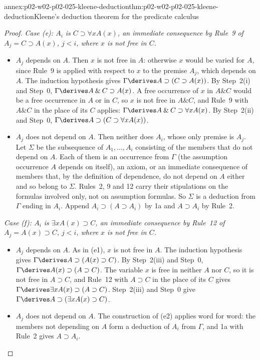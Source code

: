 \begin{annexitem}{annex:p02-w02-p02-025-kleene-deduction}{thm:p02-w02-p02-025-kleene-deduction}{Kleene's deduction theorem for the predicate calculus}
\begin{proof}
\emph{Case (e): \(A_i\) is \(C\supset\forall xA(x)\), an immediate
consequence by Rule~9 of \(A_j=C\supset A(x)\), \(j<i\), where \(x\) is not
free in \(C\).}
\begin{itemize}
  \item[(e1)] \(A_j\) depends on \(A\).  Then \(x\) is not free in \(A\):
        otherwise \(x\) would be varied for \(A\), since Rule~9 is applied
        with respect to \(x\) to the premise \(A_j\), which depends on \(A\).
        The induction hypothesis gives
        \(\Gamma\derives A\supset(C\supset A(x))\).  By Step~2(i) and Step~0,
        \(\Gamma\derives A\mathbin{\&}C\supset A(x)\).  A free occurrence of
        \(x\) in \(A\mathbin{\&}C\) would be a free occurrence in \(A\) or in
        \(C\), so \(x\) is not free in \(A\mathbin{\&}C\), and Rule~9 with
        \(A\mathbin{\&}C\) in the place of its \(C\) applies:
        \(\Gamma\derives A\mathbin{\&}C\supset\forall xA(x)\).  By
        Step~2(ii) and Step~0,
        \(\Gamma\derives A\supset(C\supset\forall xA(x))\).
  \item[(e2)] \(A_j\) does not depend on \(A\).  Then neither does \(A_i\),
        whose only premise is \(A_j\).  Let \(\Sigma\) be the subsequence of
        \(A_1,\ldots,A_i\) consisting of the members that do not depend on
        \(A\).  Each of them is an occurrence from \(\Gamma\) (the assumption
        occurrence \(A\) depends on itself), an axiom, or an immediate
        consequence of members that, by the definition of dependence, do
        not depend on \(A\) either and so belong to \(\Sigma\).  Rules~2, 9
        and 12 carry their stipulations on the formulas involved only, not
        on assumption formulas.  So \(\Sigma\) is a deduction from \(\Gamma\)
        ending in \(A_i\).  Append \(A_i\supset(A\supset A_i)\) by 1a and
        \(A\supset A_i\) by Rule~2.
\end{itemize}

\emph{Case (f): \(A_i\) is \(\exists xA(x)\supset C\), an immediate
consequence by Rule~12 of \(A_j=A(x)\supset C\), \(j<i\), where \(x\) is not
free in \(C\).}
\begin{itemize}
  \item[(f1)] \(A_j\) depends on \(A\).  As in (e1), \(x\) is not free in
        \(A\).  The induction hypothesis gives
        \(\Gamma\derives A\supset(A(x)\supset C)\).  By Step~2(iii) and
        Step~0, \(\Gamma\derives A(x)\supset(A\supset C)\).  The variable
        \(x\) is free in neither \(A\) nor \(C\), so it is not free in
        \(A\supset C\), and Rule~12 with \(A\supset C\) in the place of its
        \(C\) gives \(\Gamma\derives\exists xA(x)\supset(A\supset C)\).
        Step~2(iii) and Step~0 give
        \(\Gamma\derives A\supset(\exists xA(x)\supset C)\).
  \item[(f2)] \(A_j\) does not depend on \(A\).  The construction of (e2)
        applies word for word: the members not depending on \(A\) form a
        deduction of \(A_i\) from \(\Gamma\), and 1a with Rule~2 gives
        \(A\supset A_i\).
\end{itemize}


\end{proof}
\end{annexitem}
